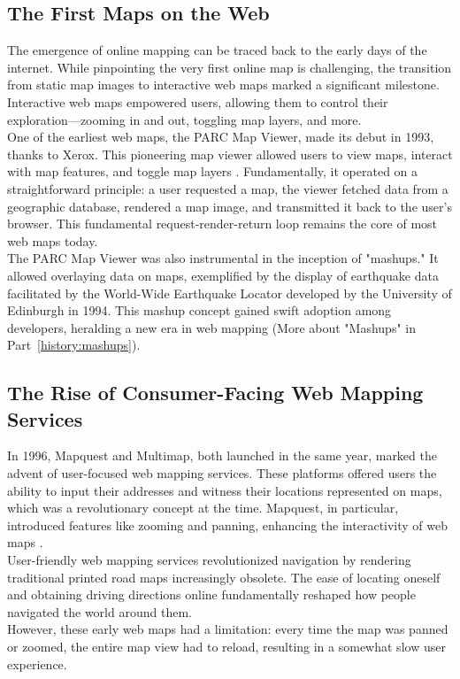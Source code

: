 \documentclass[10pt,oneside,english,a4paper]{article}
\begin{document}
\subsection{The First Maps on the Web} \label{history:firstweb}
The emergence of online mapping can be traced back to the early days of the internet. While pinpointing the very first online map is challenging, the transition from static map images to interactive web maps marked a significant milestone. Interactive web maps empowered users, allowing them to control their exploration—zooming in and out, toggling map layers, and more.
\\One of the earliest web maps, the PARC Map Viewer, made its debut in 1993, thanks to Xerox. This pioneering map viewer allowed users to view maps, interact with map features, and toggle map layers \cite{Forrest2021}. Fundamentally, it operated on a straightforward principle: a user requested a map, the viewer fetched data from a geographic database, rendered a map image, and transmitted it back to the user's browser. This fundamental request-render-return loop remains the core of most web maps today.
\\The PARC Map Viewer was also instrumental in the inception of "mashups." It allowed overlaying data on maps, exemplified by the display of earthquake data facilitated by the World-Wide Earthquake Locator developed by the University of Edinburgh in 1994. This mashup concept gained swift adoption among developers, heralding a new era in web mapping (More about "Mashups" in Part~\ref{history:mashups}).

\subsection{The Rise of Consumer-Facing Web Mapping Services} \label{history:userfriendly}
In 1996, Mapquest and Multimap, both launched in the same year, marked the advent of user-focused web mapping services. These platforms offered users the ability to input their addresses and witness their locations represented on maps, which was a revolutionary concept at the time. Mapquest, in particular, introduced features like zooming and panning, enhancing the interactivity of web maps \cite{Forrest2021}.
\\User-friendly web mapping services revolutionized navigation by rendering traditional printed road maps increasingly obsolete. The ease of locating oneself and obtaining driving directions online fundamentally reshaped how people navigated the world around them.
\\However, these early web maps had a limitation: every time the map was panned or zoomed, the entire map view had to reload, resulting in a somewhat slow user experience.
\end{document}
